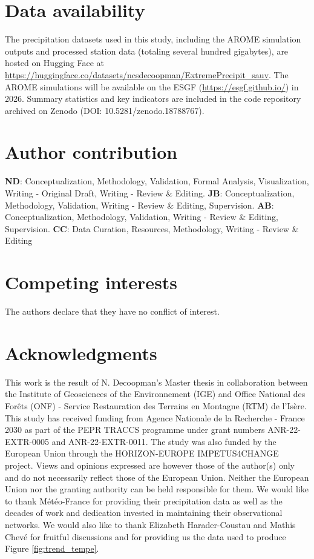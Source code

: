 \documentclass[hess, manuscript]{copernicus}
\begin{document}
\section*{Data availability}
The precipitation datasets used in this study, including the AROME simulation outputs and processed station data (totaling several hundred gigabytes), are hosted on Hugging Face at \url{https://huggingface.co/datasets/ncsdecoopman/ExtremePrecipit_sauv}. The AROME simulations will be available on the ESGF (\url{https://esgf.github.io/}) in 2026. Summary statistics and key  indicators are included in the code repository archived on Zenodo (DOI: 10.5281/zenodo.18788767).

\section*{Author contribution}
\textbf{ND}: Conceptualization, Methodology, Validation, Formal Analysis, Visualization, Writing - Original Draft, Writing - Review \& Editing. \textbf{JB}: Conceptualization, Methodology, Validation, Writing - Review \& Editing, Supervision. \textbf{AB}: Conceptualization, Methodology, Validation, Writing - Review \& Editing, Supervision. \textbf{CC}: Data Curation, Resources, Methodology, Writing - Review \& Editing

\section*{Competing interests}
The authors declare that they have no conflict of interest.

\section*{Acknowledgments}
This work is the result of N. Decoopman's Master thesis in collaboration between the Institute of Geosciences of the Environnement (IGE) and Office National des Forêts (ONF) - Service Restauration des Terrains en Montagne (RTM) de l'Isère. This study has received funding from Agence Nationale de la Recherche - France 2030 as part of the PEPR TRACCS programme under grant numbers ANR-22-EXTR-0005 and ANR-22-EXTR-0011. The study was also funded by the European Union through the HORIZON-EUROPE IMPETUS4CHANGE project. Views and opinions expressed are however those of the author(s) only and do not necessarily reflect those of the European Union. Neither the European Union nor the granting authority can be held responsible for them. We would like to thank Météo-France for providing their precipitation data as well as the decades of work and dedication invested in maintaining their observational networks. We would also like to thank Elizabeth Harader-Coustau and Mathis Chevé for fruitful discussions and for providing us the data used to produce Figure \ref{fig:trend_tempe}.
\end{document}
